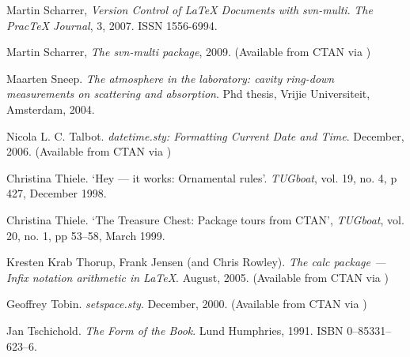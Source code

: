 \begin{thebibliography}{GMS94A}
Martin Scharrer,
\newblock\emph{Version Control of LaTeX Documents with svn-multi}.
\newblock  \emph{The Prac{\TeX} Journal}, 3, 2007.
\newblock ISSN 1556-6994.

Martin Scharrer, 
\newblock\emph{The \textsf{svn-multi} package}, 2009. 
\newblock (Available from CTAN via
) 


  Maarten Sneep.
  \newblock \emph{The atmosphere in the laboratory: cavity ring-down
                  measurements on scattering and absorption}.
  \newblock Phd thesis,
  \newblock Vrijie Universiteit, Amsterdam, 2004. 

  Nicola L. C. Talbot.
  \newblock \emph{datetime.sty: Formatting Current Date and Time}.
  \newblock December, 2006.
  \newblock (Available from CTAN via
            )

  Christina Thiele.
  \newblock `Hey --- it works: Ornamental rules'. 
  \newblock \emph{TUGboat}, 
  \newblock vol. 19, no. 4, p 427, December 1998.

  Christina Thiele.
  \newblock `The Treasure Chest: Package tours from CTAN', 
  \newblock \emph{TUGboat}, 
  \newblock vol. 20, no. 1, pp 53--58, March 1999.

  Kresten Krab Thorup, Frank Jensen (and Chris Rowley).
  \newblock \emph{The calc package --- Infix notation arithmetic in LaTeX}.
  \newblock August, 2005.
  \newblock (Available from CTAN via
            )

\begin{comment}
\bibitem[Tin63]{TINKER63}
  Miles A.~Tinker.
  \newblock \emph{Legibility of Print}.
  \newblock Books on Demand (University Microfilms International), 1963.
\end{comment}

  Geoffrey Tobin.
  \newblock \emph{setspace.sty}.
  \newblock December, 2000.
  \newblock (Available from CTAN via
            )

  Jan Tschichold.
  \newblock \emph{The Form of the Book}.
  \newblock Lund Humphries, 1991.
  \newblock ISBN 0--85331--623--6.

\begin{comment}
\bibitem[Tuf83]{TUFTE83}
  Edward R. Tufte.
  \newblock \emph{The Visual Display of Quantative Information}.
  \newblock Graphics Press, 1983.
\end{comment}


\end{thebibliography}
